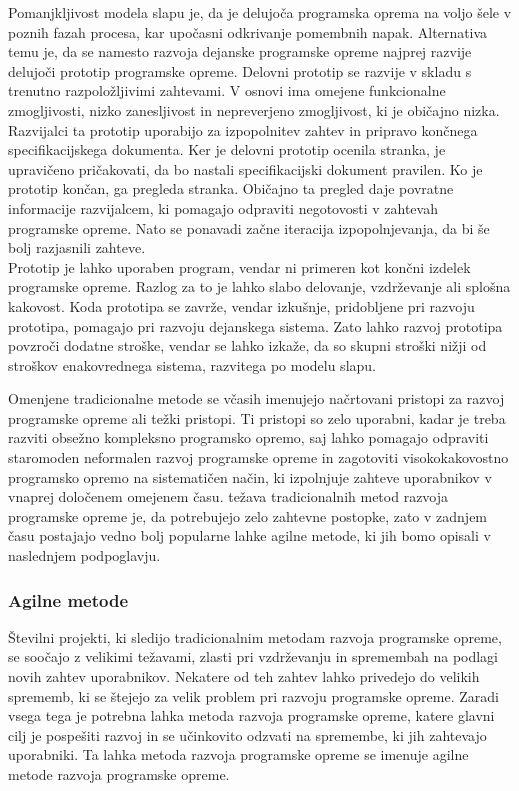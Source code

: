\documentclass[a4paper,12pt,openright]{book}
\begin{document}
Pomanjkljivost modela slapu je, da je delujoča programska oprema na voljo šele v poznih fazah procesa, kar upočasni odkrivanje pomembnih napak. Alternativa temu je, da se namesto razvoja dejanske programske opreme najprej razvije delujoči prototip programske opreme. Delovni prototip se razvije v skladu s trenutno razpoložljivimi zahtevami. V osnovi ima omejene funkcionalne zmogljivosti, nizko zanesljivost in nepreverjeno zmogljivost, ki je običajno nizka. \\
Razvijalci ta prototip uporabijo za izpopolnitev zahtev in pripravo končnega specifikacijskega dokumenta. Ker je delovni prototip ocenila stranka, je upravičeno pričakovati, da bo nastali specifikacijski dokument pravilen. Ko je prototip končan, ga pregleda stranka. Običajno ta pregled daje povratne informacije razvijalcem, ki pomagajo odpraviti negotovosti v zahtevah programske opreme. Nato se ponavadi začne iteracija izpopolnjevanja, da bi še bolj razjasnili zahteve. \\
Prototip je lahko uporaben program, vendar ni primeren kot končni izdelek programske opreme. Razlog za to je lahko slabo delovanje, vzdrževanje ali splošna kakovost. Koda prototipa se zavrže, vendar izkušnje, pridobljene pri razvoju prototipa, pomagajo pri razvoju dejanskega sistema. Zato lahko razvoj prototipa povzroči dodatne stroške, vendar se lahko izkaže, da so skupni stroški nižji od stroškov enakovrednega sistema, razvitega po modelu slapu. \cite{aggarwal2005software}

Omenjene tradicionalne metode se včasih imenujejo načrtovani pristopi za razvoj programske opreme ali težki pristopi. Ti pristopi so zelo uporabni, kadar je treba razviti obsežno kompleksno programsko opremo, saj lahko pomagajo odpraviti staromoden neformalen razvoj programske opreme in zagotoviti visokokakovostno programsko opremo na sistematičen način, ki izpolnjuje zahteve uporabnikov v vnaprej določenem omejenem času. težava tradicionalnih metod razvoja programske opreme je, da potrebujejo zelo zahtevne postopke, zato v zadnjem času postajajo vedno bolj popularne lahke agilne metode, ki jih bomo opisali v naslednjem podpoglavju.


\subsubsection{Agilne metode}
Številni projekti, ki sledijo tradicionalnim metodam razvoja programske opreme, se soočajo z velikimi težavami, zlasti pri vzdrževanju in spremembah na podlagi novih zahtev uporabnikov. Nekatere od teh zahtev lahko privedejo do velikih sprememb, ki se štejejo za velik problem pri razvoju programske opreme.  Zaradi vsega tega je potrebna lahka metoda razvoja programske opreme, katere glavni cilj je pospešiti razvoj in se učinkovito odzvati na spremembe, ki jih zahtevajo uporabniki. Ta lahka metoda razvoja programske opreme se imenuje agilne metode razvoja programske opreme. 
\cite{AlSaqqa2020AgileSD}
\end{document}
